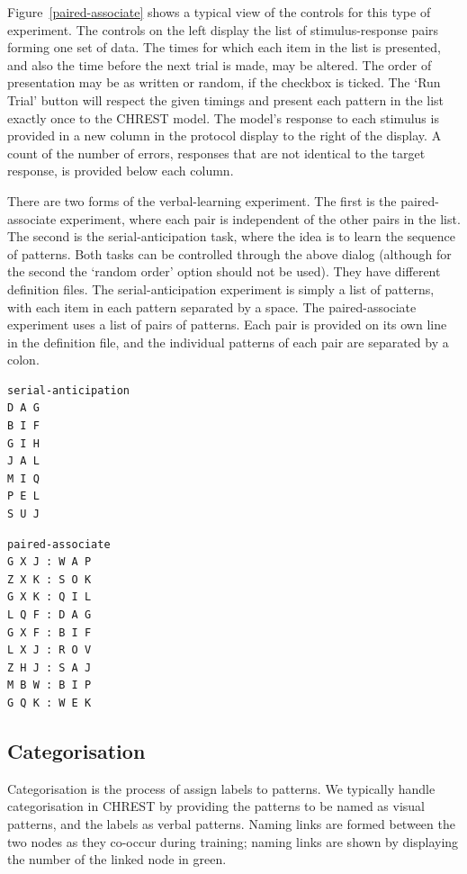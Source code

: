 \documentclass{article}
\begin{document}
Figure~\ref{paired-associate} shows a typical view of the controls for this
type of experiment.  The controls on the left display the list of
stimulus-response pairs forming one set of data.  The times for which each item
in the list is presented, and also the time before the next trial is made, may
be altered.  The order of presentation may be as written or random, if the
checkbox is ticked.  The  `Run Trial' button will respect the given timings and
present each pattern in the list exactly once to the CHREST model.  The model's
response to each stimulus is provided in a new column in the protocol display
to the right of the display.  A count of the number of errors, responses that
are not identical to the target response, is provided below each column.  

There are two forms of the verbal-learning experiment.  The first is the
paired-associate experiment, where each pair is independent of the other pairs
in the list.  The second is the serial-anticipation task, where the idea is to
learn the sequence of patterns.  Both tasks can be controlled through the above
dialog (although for the second the `random order' option should not be used).
They have different definition files.  The serial-anticipation experiment is
simply a list of patterns, with each item in each pattern separated by a space.
The paired-associate experiment uses a list of pairs of patterns.  Each pair is
provided on its own line in the definition file, and the individual patterns of
each pair are separated by a colon.

\begin{verbatim}
serial-anticipation 
D A G 
B I F 
G I H 
J A L 
M I Q 
P E L 
S U J
\end{verbatim} 

\begin{verbatim}
paired-associate 
G X J : W A P 
Z X K : S O K 
G X K : Q I L 
L Q F : D A G 
G X F : B I F 
L X J : R O V 
Z H J : S A J 
M B W : B I P 
G Q K : W E K
\end{verbatim}

\subsection{Categorisation}

Categorisation is the process of assign labels to patterns.  We typically
handle categorisation in CHREST by providing the patterns to be named as visual
patterns, and the labels as verbal patterns.  Naming links are formed between
the two nodes as they co-occur during training; naming links are shown by
displaying the number of the linked node in green.
\end{document}
